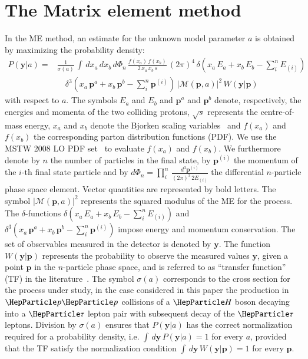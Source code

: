 \section{The Matrix element method}
\label{sec:mem}

In the ME method, an estimate for the unknown model parameter $a$
is obtained by maximizing the probability density:
\begin{align}
P(\bm{y}|a) = & \frac{1}{\sigma(a)} \, \int \, dx_{a} \, dx_{b} \,
d\Phi_{n} \, \frac{f(x_{a}) \, f(x_{b})}{2 \, x_{a} \, x_{b} \, s} \, (2\pi)^{4} \,
\delta( x_{a} \, E_{a} + x_{b} \, E_{b} - \sum_{i}^{n}
E_{(i)}) \, \nonumber \\
 & \quad \delta^{3}( x_{a} \, \bm{p}^{a} + x_{b} \, \bm{p}^{b} - \sum_{i}^{n}
\bm{p}^{(i)}) \, 
  \vert \mathcal{M}(\bm{p},a) \vert^{2} \, W(\bm{y}|\bm{p}) 
\label{eq:mem}
\end{align}
with respect to $a$.
The symbols $E_{a}$ and $E_{b}$ and $\bm{p}^{a}$ and $\bm{p}^{b}$ denote, respectively, the energies and momenta of the two colliding protons,
$\sqrt{s}$ represents the centre-of-mass energy,
$x_{a}$ and $x_{b}$ denote the Bjorken scaling variables~\cite{Bjorkenx}
and $f(x_{a})$ and $f(x_{b})$ the corresponding parton distribution
functions (PDF).
We use the MSTW 2008 LO PDF set~\cite{MSTW} to evaluate $f(x_{a})$ and $f(x_{b})$.
We furthermore denote by $n$ the number of particles in the final state,
by $\bm{p}^{(i)}$ the momentum of the $i$-th final state particle
and by $d\Phi_{n} = \prod_{i}^{n} \,
\frac{d^{3}\bm{p}^{(i)}}{(2\pi)^{3} \, 2 E_{(i)}}$ the differential $n$-particle
phase space element.
Vector quantities are represented by bold letters.
The symbol $\vert \mathcal{M}(\bm{p},a) \vert^{2}$ represents the
squared modulus of the ME for
the process.
The $\delta$-functions $\delta( x_{a} \, E_{a} + x_{b} \, E_{b} - \sum_{i}^{n} E_{(i)})$
and $\delta^{3}( x_{a} \, \bm{p}^{a} + x_{b} \, \bm{p}^{b} - \sum_{i}^{n} \bm{p}^{(i)})$ 
impose energy and momentum conservation.
The set of observables measured in the
detector is denoted by $\bm{y}$.
The function $W(\bm{y}|\bm{p})$ represents the probability to
observe the measured values $\bm{y}$, given a point $\bm{p}$ in the
$n$-particle phase space, and
is referred to as ``transfer function'' (TF) in the
literature~\cite{Fiedler:2010sg,Volobouev:2011vb}.
The symbol $\sigma(a)$ corresponds to the cross section for the process under study,
in the case considered in this paper the production in $\Pp\Pp$ collisions of a $\PHiggs$ boson decaying into a $\Pgt$ lepton pair
with subsequent decay of the $\Pgt$ leptons.
Division by $\sigma(a)$ ensures that $P(\bm{y}|a)$ has
the correct normalization required for a probability density, 
i.e. $\int \, d\bm{y} \, P(\bm{y}|a) = 1$ for every $a$, 
provided that the TF satisfy the normalization condition
$\int \, d\bm{y}\, W(\bm{y}|\bm{p}) = 1$
for every $\bm{p}$.

